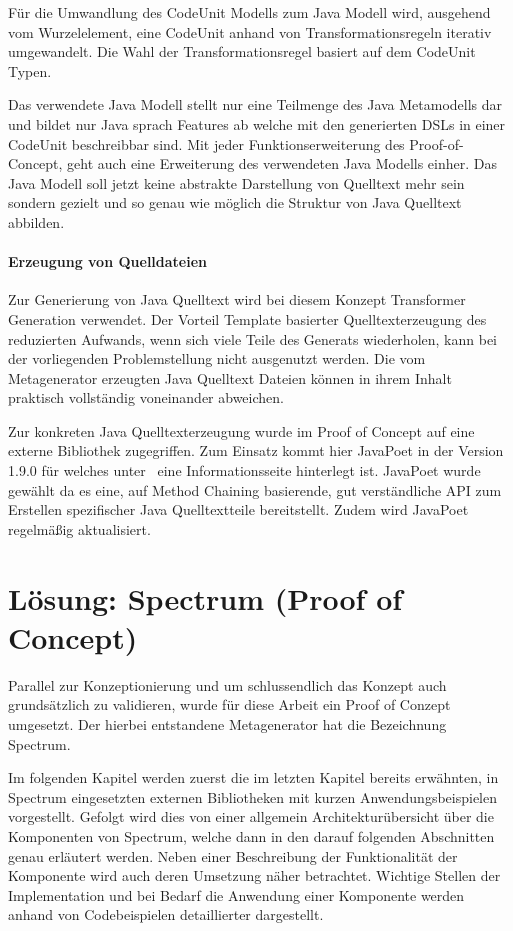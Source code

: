 \documentclass[12pt,oneside,a4paper,parskip]{scrbook}
\begin{document}
Für die Umwandlung des CodeUnit Modells zum Java Modell wird, ausgehend vom Wurzelelement, eine CodeUnit anhand von Transformationsregeln iterativ umgewandelt. Die Wahl der Transformationsregel basiert auf dem CodeUnit Typen.

Das verwendete Java Modell stellt nur eine Teilmenge des Java Metamodells dar und bildet nur Java sprach Features ab welche mit den generierten DSLs in einer CodeUnit beschreibbar sind. Mit jeder Funktionserweiterung des Proof-of-Concept, geht auch eine Erweiterung des verwendeten Java Modells einher. Das Java Modell soll jetzt keine abstrakte Darstellung von Quelltext mehr sein sondern gezielt und so genau wie möglich die Struktur von Java Quelltext abbilden.

\subsubsection{Erzeugung von Quelldateien}

Zur Generierung von Java Quelltext wird bei diesem Konzept Transformer Generation verwendet. Der Vorteil Template basierter Quelltexterzeugung des reduzierten Aufwands, wenn sich viele Teile des Generats wiederholen, kann bei der vorliegenden Problemstellung nicht ausgenutzt werden. Die vom Metagenerator erzeugten Java Quelltext Dateien können in ihrem Inhalt praktisch vollständig voneinander abweichen.

Zur konkreten Java Quelltexterzeugung wurde im Proof of Concept auf eine externe Bibliothek zugegriffen. Zum Einsatz kommt hier JavaPoet in der Version 1.9.0 für welches unter~\cite{javapoet2017} eine Informationsseite hinterlegt ist. JavaPoet wurde gewählt da es eine, auf Method Chaining basierende, gut verständliche API zum Erstellen spezifischer Java Quelltextteile bereitstellt. Zudem wird JavaPoet regelmäßig aktualisiert.

\chapter{Lösung: Spectrum (Proof of Concept)}

Parallel zur Konzeptionierung und um schlussendlich das Konzept auch grundsätzlich zu validieren, wurde für diese Arbeit ein Proof of Conzept umgesetzt. Der hierbei entstandene Metagenerator hat die Bezeichnung Spectrum.

Im folgenden Kapitel werden zuerst die im letzten Kapitel bereits erwähnten, in Spectrum eingesetzten externen Bibliotheken mit kurzen Anwendungsbeispielen vorgestellt. Gefolgt wird dies von einer allgemein Architekturübersicht über die Komponenten von Spectrum, welche dann in den darauf folgenden Abschnitten genau erläutert werden. Neben einer Beschreibung der Funktionalität der Komponente wird auch deren Umsetzung näher betrachtet. Wichtige Stellen der Implementation und bei Bedarf die Anwendung einer Komponente werden anhand von Codebeispielen detaillierter dargestellt.
\end{document}
